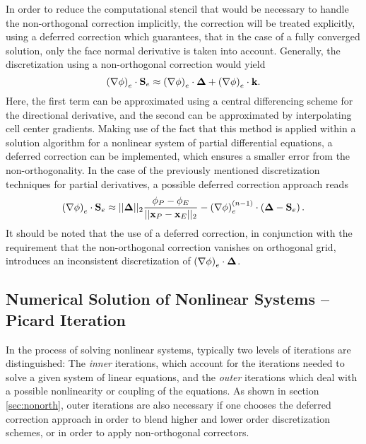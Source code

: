 In order to reduce the computational stencil that would be necessary to handle the non-orthogonal correction implicitly, the correction will be treated explicitly, using a deferred correction which guarantees, that in the case of a fully converged solution, only the face normal derivative is taken into account. Generally, the discretization using a non-orthogonal correction would yield 
\begin{displaymath}
  \left( \nabla \phi \right)_e \cdot \mathbf{S}_e \approx \left(\nabla \phi \right)_e \cdot \boldsymbol{\Delta} + \left( \nabla \phi \right)_e \cdot \mathbf{k}.
\end{displaymath}
Here, the first term can be approximated using a central differencing scheme for the directional derivative, and the second can be approximated by interpolating cell center gradients. Making use of the fact that this method is applied within a solution algorithm for a nonlinear system of partial differential equations, a deferred correction can be implemented, which ensures a smaller error from the non-orthogonality. In the case of the previously mentioned discretization techniques for partial derivatives, a possible deferred correction approach reads
\begin{displaymath}
  \left( \nabla \phi \right)_e \cdot \mathbf{S}_e \approx ||\boldsymbol{\Delta}||_2 \frac{\phi_P - \phi_E}{||\mathbf{x}_P - \mathbf{x}_E||_2} - \left(\nabla \phi \right)_e^{(n-1)} \cdot \left(\boldsymbol{\Delta} - \mathbf{S}_e \right).
\end{displaymath}
It should be noted that the use of a deferred correction, in conjunction with the requirement that the non-orthogonal correction vanishes on orthogonal grid, introduces an inconsistent discretization of \( \left(\nabla \phi \right)_e \cdot \boldsymbol{\Delta} \).

\subsection{Numerical Solution of Nonlinear Systems -- Picard Iteration}
\label{sec:nonlinear}

In the process of solving nonlinear systems, typically two levels of iterations are distinguished: The \emph{inner} iterations, which account for the iterations needed to solve a given system of linear equations, and the \emph{outer} iterations which deal with a possible nonlinearity or coupling of the equations. As shown in section \ref{sec:nonorth}, outer iterations are also necessary if one chooses the deferred correction approach in order to blend higher and lower order discretization schemes, or in order to apply non-orthogonal correctors.

